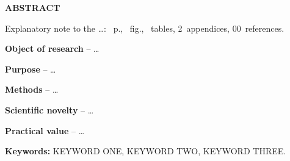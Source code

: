 \begin{english}
  \vspace{1\baselineskip}
  {\centering\bfseries ABSTRACT\par}
  \vspace{1\baselineskip}

  Explanatory note to the \dots: \pageref{LastPage}~p., ~fig.,
  ~tables, 2~appendices, 00~references.

  \textbf{Object of research} -- \dots

  \textbf{Purpose} -- \dots

  \textbf{Methods} -- \dots

  \textbf{Scientific novelty} -- \dots

  \textbf{Practical value} -- \dots

  \textbf{Keywords:} \MakeUppercase{keyword one, keyword two, keyword three}.
\end{english}
